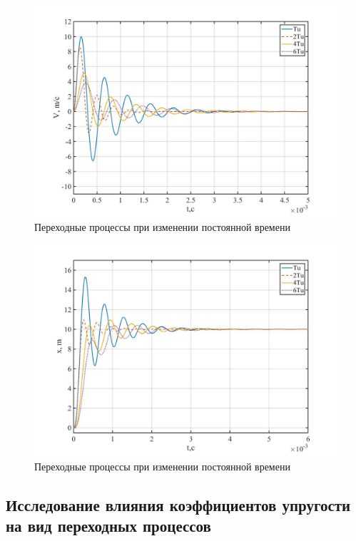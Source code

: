 \documentclass[a4paper, 12pt]{article}
\begin{document}
\begin{figure}[h!]
	\centering
	\includegraphics[width = 0.6\textheight]{data/V_tu}
	\caption{Переходные процессы при изменении постоянной времени}
	\label{V_tu}
\end{figure}

\newpage

\begin{figure}[h!]
	\centering
	\includegraphics[width = 0.6\textheight]{data/x_tu}
	\caption{Переходные процессы при изменении постоянной времени}
	\label{x_tu}
\end{figure}

\newpage

\begin{center}
	\section{Исследование влияния коэффициентов упругости на вид переходных процессов}
\end{center}\par
\end{document}
